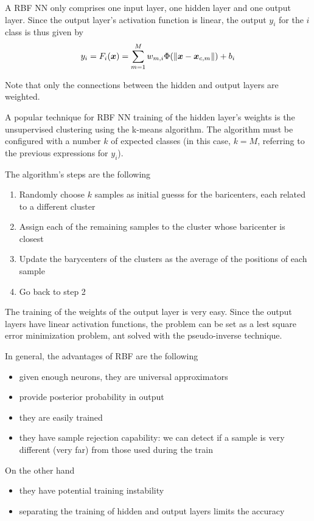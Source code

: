 \documentclass[oneside,onecolumn]{report}
\begin{document}
A RBF NN only comprises one input layer, one hidden layer and one output layer.
Since the output layer's activation function is linear, the output $y_i$ for the $i$ class is thus given by
$$ y_i = F_i(\bm x) = \sum_{m = 1}^M w_{m, i} \Phi(\norm{\bm x - \bm x_{c,m}}) + b_i $$

Note that only the connections between the hidden and output layers are weighted.

A popular technique for RBF NN training of the hidden layer's weights is the unsupervised clustering using the k-means algorithm.
The algorithm must be configured with a number $k$ of expected classes (in this case, $k = M$, referring to the previous expressions for $y_i$).

The algorithm's steps are the following
\begin{enumerate}
    \item Randomly choose $k$ samples as initial guesss for the baricenters, each related to a different cluster
    \item Assign each of the remaining samples to the cluster whose baricenter is closest
    \item Update the barycenters of the clusters as the average of the positions of each sample
    \item Go back to step 2
\end{enumerate}

The training of the weights of the output layer is very easy.
Since the output layers have linear activation functions, the problem can be set as a lest square error minimization problem, ant solved with the pseudo-inverse technique.

In general, the advantages of RBF are the following
\begin{itemize}
    \item given enough neurons, they are universal approximators
    \item provide posterior probability in output
    \item they are easily trained
    \item they have sample rejection capability: we can detect if a sample is very different (very far) from those used during the train
\end{itemize}

On the other hand
\begin{itemize}
    \item they have potential training instability
    \item separating the training of hidden and output layers limits the accuracy
\end{itemize}
\end{document}
